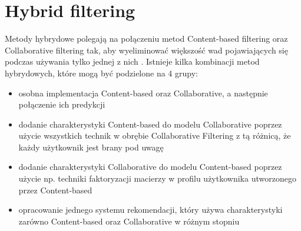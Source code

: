 \section{Hybrid filtering}


Metody hybrydowe polegają na połączeniu metod Content-based filtering oraz Collaborative filtering tak, aby wyeliminować większość wad pojawiających się podczas używania tylko jednej z nich \cite{REC01}. Istnieje kilka kombinacji metod hybrydowych, które mogą być podzielone na 4 grupy:
\begin{itemize}
	\item osobna implementacja Content-based oraz Collaborative, a następnie połączenie ich predykcji 
	\item dodanie charakterystyki Content-based do modelu Collaborative poprzez użycie wszystkich technik w obrębie Collaborative Filtering z tą różnicą, że każdy użytkownik jest brany pod uwagę
	\item dodanie charakterystyki Collaborative do modelu Content-based poprzez użycie np. techniki faktoryzacji macierzy w profilu użytkownika utworzonego przez Content-based
	\item opracowanie jednego systemu rekomendacji, który używa charakterystyki zarówno Content-based oraz Collaborative w różnym stopniu
\end{itemize}
